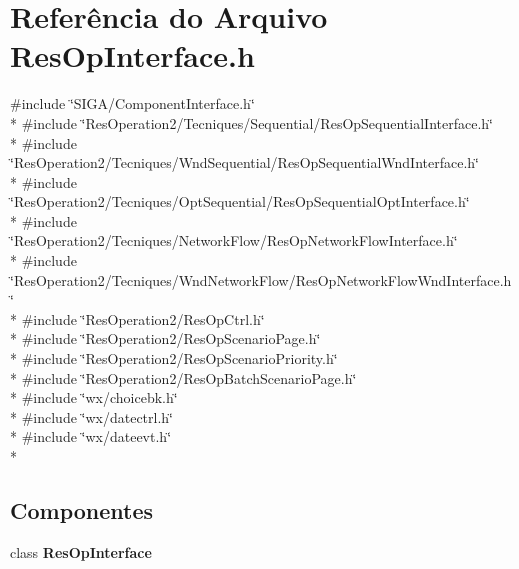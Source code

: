 \section{Referência do Arquivo Res\+Op\+Interface.\+h}
\label{_2_res_op_interface_8h}
{\ttfamily \#include \char`\"{}S\+I\+G\+A/\+Component\+Interface.\+h\char`\"{}}\\*
{\ttfamily \#include \char`\"{}Res\+Operation2/\+Tecniques/\+Sequential/\+Res\+Op\+Sequential\+Interface.\+h\char`\"{}}\\*
{\ttfamily \#include \char`\"{}Res\+Operation2/\+Tecniques/\+Wnd\+Sequential/\+Res\+Op\+Sequential\+Wnd\+Interface.\+h\char`\"{}}\\*
{\ttfamily \#include \char`\"{}Res\+Operation2/\+Tecniques/\+Opt\+Sequential/\+Res\+Op\+Sequential\+Opt\+Interface.\+h\char`\"{}}\\*
{\ttfamily \#include \char`\"{}Res\+Operation2/\+Tecniques/\+Network\+Flow/\+Res\+Op\+Network\+Flow\+Interface.\+h\char`\"{}}\\*
{\ttfamily \#include \char`\"{}Res\+Operation2/\+Tecniques/\+Wnd\+Network\+Flow/\+Res\+Op\+Network\+Flow\+Wnd\+Interface.\+h\char`\"{}}\\*
{\ttfamily \#include \char`\"{}Res\+Operation2/\+Res\+Op\+Ctrl.\+h\char`\"{}}\\*
{\ttfamily \#include \char`\"{}Res\+Operation2/\+Res\+Op\+Scenario\+Page.\+h\char`\"{}}\\*
{\ttfamily \#include \char`\"{}Res\+Operation2/\+Res\+Op\+Scenario\+Priority.\+h\char`\"{}}\\*
{\ttfamily \#include \char`\"{}Res\+Operation2/\+Res\+Op\+Batch\+Scenario\+Page.\+h\char`\"{}}\\*
{\ttfamily \#include \char`\"{}wx/choicebk.\+h\char`\"{}}\\*
{\ttfamily \#include \char`\"{}wx/datectrl.\+h\char`\"{}}\\*
{\ttfamily \#include \char`\"{}wx/dateevt.\+h\char`\"{}}\\*
\subsection*{Componentes}
\begin{DoxyCompactItemize}
\item 
class {\bf Res\+Op\+Interface}
\end{DoxyCompactItemize}
